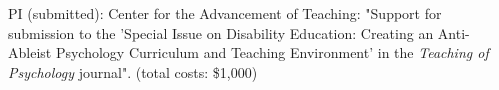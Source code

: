 

\item PI (submitted):  Center for the Advancement of Teaching: "Support for submission to the 'Special Issue on Disability Education: Creating an Anti-Ableist Psychology Curriculum and Teaching Environment' in the \textit{Teaching of Psychology} journal". (total costs: \$1,000)



%
%
